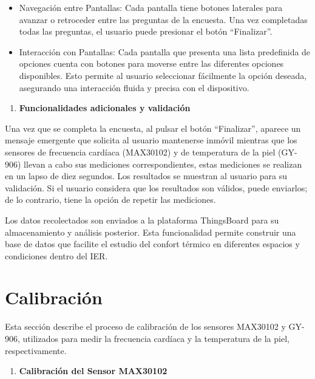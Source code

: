 \documentclass[
  12pt,
  letterpaper,
  DIV=11,
  numbers=noendperiod]{scrreport}
\providecommand{\tightlist}{%
  \setlength{\itemsep}{0pt}\setlength{\parskip}{0pt}}\usepackage{longtable,booktabs,array}
\begin{document}
\begin{itemize}
\item
  Navegación entre Pantallas: Cada pantalla tiene botones laterales para
  avanzar o retroceder entre las preguntas de la encuesta. Una vez
  completadas todas las preguntas, el usuario puede presionar el botón
  ``Finalizar''.
\item
  Interacción con Pantallas: Cada pantalla que presenta una lista
  predefinida de opciones cuenta con botones para moverse entre las
  diferentes opciones disponibles. Esto permite al usuario seleccionar
  fácilmente la opción deseada, asegurando una interacción fluida y
  precisa con el dispositivo.
\end{itemize}

\begin{enumerate}
\def\labelenumi{\arabic{enumi}.}
\setcounter{enumi}{2}
\tightlist
\item
  \textbf{Funcionalidades adicionales y validación}
\end{enumerate}

Una vez que se completa la encuesta, al pulsar el botón ``Finalizar'',
aparece un mensaje emergente que solicita al usuario mantenerse inmóvil
mientras que los sensores de frecuencia cardíaca (MAX30102) y de
temperatura de la piel (GY-906) llevan a cabo sus mediciones
correspondientes, estas mediciones se realizan en un lapso de diez
segundos. Los resultados se muestran al usuario para su validación. Si
el usuario considera que los resultados son válidos, puede enviarlos; de
lo contrario, tiene la opción de repetir las mediciones.

Los datos recolectados son enviados a la plataforma ThingsBoard para su
almacenamiento y análisis posterior. Esta funcionalidad permite
construir una base de datos que facilite el estudio del confort térmico
en diferentes espacios y condiciones dentro del IER.

\hypertarget{sec-calibraciuxf3n}{%
\section{Calibración}\label{sec-calibraciuxf3n}}

Esta sección describe el proceso de calibración de los sensores MAX30102
y GY-906, utilizados para medir la frecuencia cardíaca y la temperatura
de la piel, respectivamente.

\begin{enumerate}
\def\labelenumi{\arabic{enumi}.}
\tightlist
\item
  \textbf{Calibración del Sensor MAX30102}
\end{enumerate}
\end{document}
